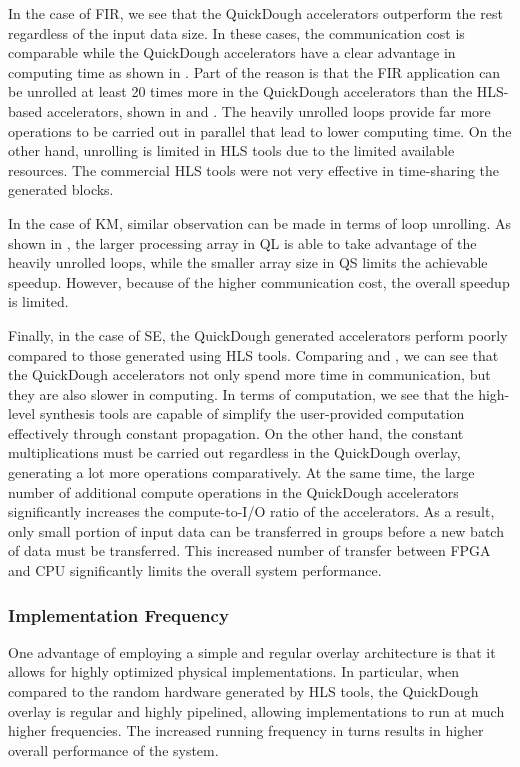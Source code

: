 In the case of FIR, we see that the QuickDough accelerators outperform the rest regardless of the
input data size.  In these cases, the communication cost is comparable while the QuickDough
accelerators have a clear advantage in computing time as shown in . Part
of the reason is that the FIR application can be unrolled at least \num{20} times more in the
QuickDough accelerators than the HLS-based accelerators, shown in
 and . The heavily
unrolled loops provide far more operations to be carried out in parallel that lead to lower
computing time. On the other hand, unrolling is limited in HLS tools due to the limited available
resources. The commercial HLS tools were not very effective in time-sharing the generated blocks.

In the case of KM, similar observation can be made in terms of loop unrolling. As shown in
, the larger processing array in QL is able to take advantage of the
heavily unrolled loops, while the smaller array size in QS limits the achievable speedup. However,
because of the higher communication cost, the overall speedup is limited.

Finally, in the case of SE, the QuickDough generated accelerators perform poorly compared to those
generated using HLS tools. Comparing  and , we can
see that the QuickDough accelerators not only spend more time in communication, but they are also
slower in computing. In terms of computation, we see that the high-level synthesis tools are capable
of simplify the user-provided computation effectively through constant propagation. On the other
hand, the constant multiplications must be carried out regardless in the QuickDough overlay,
generating a lot more operations comparatively. At the same time, the large number of additional
compute operations in the QuickDough accelerators significantly increases the compute-to-I/O ratio
of the accelerators. As a result, only small portion of input data can be transferred in groups
before a new batch of data must be transferred. This increased number of transfer between FPGA and
CPU significantly limits the overall system performance.

\subsubsection{Implementation Frequency}
One advantage of employing a simple and regular overlay architecture is that it allows for highly
optimized physical implementations. In particular, when compared to the random hardware generated by
HLS tools, the QuickDough overlay is regular and highly pipelined, allowing implementations to run
at much higher frequencies.  The increased running frequency in turns results in higher overall
performance of the system.


